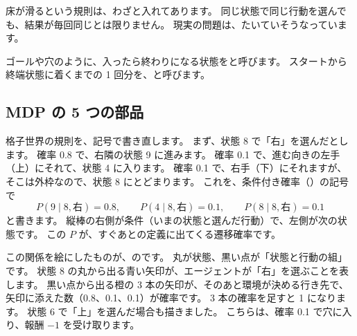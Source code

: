 床が滑るという規則は、わざと入れてあります。
同じ状態で同じ行動を選んでも、結果が毎回同じとは限りません。
現実の問題は、たいていそうなっています。

ゴールや穴のように、入ったら終わりになる状態をと呼びます。
スタートから終端状態に着くまでの 1 回分を、と呼びます。

\subsection*{MDP の 5 つの部品}

格子世界の規則を、記号で書き直します。
まず、状態 8 で「右」を選んだとします。
確率 0.8 で、右隣の状態 9 に進みます。
確率 0.1 で、進む向きの左手（上）にそれて、状態 4 に入ります。
確率 0.1 で、右手（下）にそれますが、そこは外枠なので、状態 8 にとどまります。
これを、条件付き確率（）の記号で
\[
P(9\mid 8,\text{右})=0.8,\qquad P(4\mid 8,\text{右})=0.1,\qquad P(8\mid 8,\text{右})=0.1
\]
と書きます。
縦棒の右側が条件（いまの状態と選んだ行動）で、左側が次の状態です。
この $P$ が、すぐあとの定義に出てくる遷移確率です。

この関係を絵にしたものが、のです。
丸が状態、黒い点が「状態と行動の組」です。
状態 8 の丸から出る青い矢印が、エージェントが「右」を選ぶことを表します。
黒い点から出る橙の 3 本の矢印が、そのあと環境が決める行き先で、矢印に添えた数（0.8、0.1、0.1）が確率です。
3 本の確率を足すと 1 になります。
状態 6 で「上」を選んだ場合も描きました。
こちらは、確率 0.1 で穴に入り、報酬 $-1$ を受け取ります。

